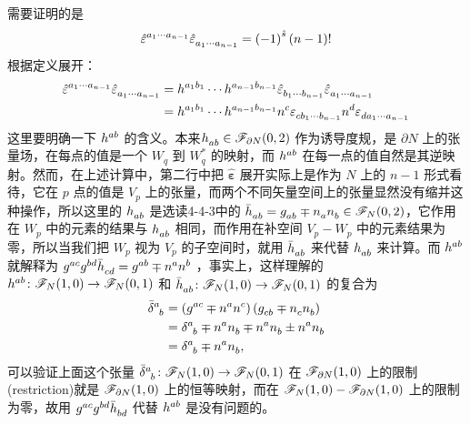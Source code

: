 \begin{xiti}
	\begin{zm}
		需要证明的是
		\begin{displaymath}
		\tensor{\hat{\varepsilon}}{^{a_1 \cdots a_{n-1} }} \tensor{\hat{\varepsilon}}{_{ a_1 \cdots a_{n-1} }} = \left(-1\right)^{\hat{s}} \left(n-1\right)!
		\end{displaymath}
		根据定义展开：
		\begin{align*}
		\tensor{\hat{\varepsilon}}{^{a_1 \cdots a_{n-1} }} \tensor{\hat{\varepsilon}}{_{ a_1 \cdots a_{n-1} }} &= \tensor{h}{^{a_1 b_1}} \cdots \tensor{h}{^{a_{n-1} b_{n-1} }} \tensor{\hat{\varepsilon}}{_{b_1 \cdots b_{n-1} }} \tensor{\hat{\varepsilon}}{_{ a_1 \cdots a_{n-1} }}\\
		&= \tensor{h}{^{a_1 b_1}} \cdots \tensor{h}{^{a_{n-1} b_{n-1} }} \tensor{n}{^c} \tensor{\varepsilon}{_{c b_1 \cdots b_{n-1} }} \tensor{n}{^d} \tensor{\varepsilon}{_{ d a_1 \cdots a_{n-1} }}
		\end{align*}
		这里要明确一下 $\tensor{h}{^a^b}$ 的含义。本来$\tensor{h}{_a_b} \in \F_{\partial N}(0,2)$ 作为诱导度规，是 $\partial N$ 上的张量场，在每点的值是一个 $W_q $ 到 $W_q^* $ 的映射，而 $\tensor{h}{^a^b}$ 在每一点的值自然是其逆映射。然而，在上述计算中，第二行中把 $\bm{\hat{\varepsilon}}$ 展开实际上是作为 $N$ 上的 $n-1$ 形式看待，它在 $p$ 点的值是 $V_p$ 上的张量，而两个不同矢量空间上的张量显然没有缩并这种操作，所以这里的 $\tensor{h}{_a_b}$ 是选读4-4-3中的 $\tensor{\bar{h}}{_a_b} = \tensor{g}{_a_b} \mp \tensor{n}{_a} \tensor{n}{_b} \in \F_N(0,2) $，它作用在 $W_p$ 中的元素的结果与 $\tensor{h}{_a_b}$ 相同，而作用在补空间 $V_p-W_p$ 中的元素结果为零，所以当我们把 $W_p$ 视为 $V_p$ 的子空间时，就用 $\tensor{\bar{h}}{_a_b}$ 来代替 $\tensor{h}{_a_b}$ 来计算。而 $\tensor{h}{^a^b}$ 就解释为 $\tensor{g}{^a^c} \tensor{g}{^b^d} \tensor{\bar{h}}{_c_d} = \tensor{g}{^a^b} \mp \tensor{n}{^a} \tensor{n}{^b}$ ，事实上，这样理解的 $\tensor{h}{^a^b} \colon \F_N (1,0) \rightarrow \F_N(0,1) $ 和 $\tensor{\bar{h}}{_a_b} \colon \F_N (1,0) \rightarrow \F_N (0,1) $ 的复合为
		\begin{align*}
		\tensor{\bar{\delta}}{^a_b} &= \left( \tensor{g}{^a^c} \mp \tensor{n}{^a} \tensor{n}{^c} \right) \left( \tensor{g}{_c_b} \mp \tensor{n}{_c} \tensor{n}{_b} \right)\\
		&= \tensor{\delta}{^a_b} \mp \tensor{n}{^a} \tensor{n}{_b} \mp \tensor{n}{^a} \tensor{n}{_b} \pm \tensor{n}{^a} \tensor{n}{_b}\\
		&= \tensor{\delta}{^a_b} \mp \tensor{n}{^a} \tensor{n}{_b},
		\end{align*}
		可以验证上面这个张量 $\tensor{\bar{\delta}}{^a_b} \colon \F_N(1,0) \rightarrow \F_N(0,1) $ 在 $\mathscr{F}_{\partial N}(1,0) $ 上的限制(restriction)就是 $\mathscr{F}_{\partial N}(1,0) $ 上的恒等映射，而在 $\mathscr{F}_N(1,0) - \mathscr{F}_{\partial N}(1,0) $ 上的限制为零，故用 $\tensor{g}{^a^c} \tensor{g}{^b^d} \tensor{\bar{h}}{_b_d}$ 代替 $\tensor{h}{^a^b}$ 是没有问题的。


\end{zm}
\end{xiti}
